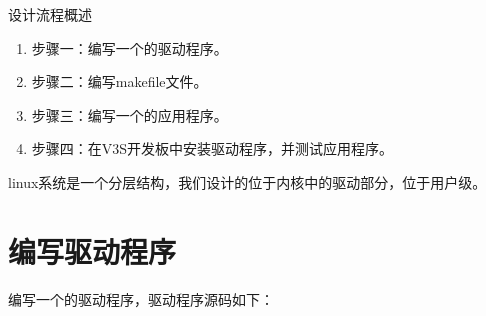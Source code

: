 \documentclass[lang=cn,newtx,10pt,scheme=chinese]{elegantbook}
\begin{document}
设计流程概述

\begin{enumerate}
    \item 步骤一：编写一个的驱动程序。
    \item 步骤二：编写makefile文件。
    \item 步骤三：编写一个的应用程序。
    \item 步骤四：在V3S开发板中安装驱动程序，并测试应用程序。
\end{enumerate}

linux系统是一个分层结构，我们设计的位于内核中的驱动部分，位于用户级。

\section{编写驱动程序}

编写一个的驱动程序，驱动程序源码如下：
\end{document}
